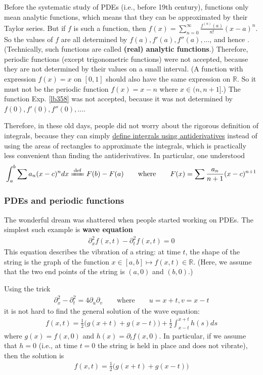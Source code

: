 \documentclass[12pt,b5paper,notitlepage]{article}
\theoremstyle{definition}
\theoremstyle{plain}
\newcommand{\Rbb}{\mathbb R}
\numberwithin{equation}{section}
\begin{document}
Before the systematic study of PDEs (i.e., before 19th century), functions only mean analytic functions, which means that they can be approximated by their Taylor series. But if $f$ is such a function, then $f(x)=\sum_{n=0}^\infty \frac{f^{(n)}(a)}{n!}(x-a)^n$. So the values of $f$ are all determined by $f(a),f'(a),f''(a),\dots$, and hence . (Technically, such functions are called \textbf{(real) analytic functions}.) Therefore, periodic functions (except trigonometric functions) were not accepted, because they are not determined by their values on a small interval. (A function with expression $f(x)=x$ on $[0,1]$ should also have the same expression on $\Rbb$. So it must not be the periodic function $f(x)=x-n$ where $x\in(n,n+1]$.) The function Exp. \ref{lb358} was not accepted, because it was not determined by $f(0),f'(0),f''(0),\dots$.

Therefore, in these old days, people did not worry about the rigorous definition of integrals, because they can simply \uline{define integrals using antiderivatives} instead of using the areas of rectangles to approximate the integrals, which is practically less convenient than finding the antiderivatives. In particular, one understood
\begin{align*}
\int_a^b \sum a_n (x-c)^ndx\xlongequal{\mathrm{def}}F(b)-F(a)\qquad\text{where}\qquad F(x)=\sum \frac{a_n}{n+1}(x-c)^{n+1}
\end{align*}

\subsubsection{PDEs and periodic functions}

The wonderful dream was shattered when people started working on PDEs. The simplest such example is \textbf{wave equation}
\begin{align}
\partial_x^2f(x,t)-\partial_t^2f(x,t)=0
\end{align} 
This equation describes the vibration of a string: at time $t$, the shape of the string is the graph of the function $x\in[a,b]\mapsto f(x,t)\in\Rbb$. (Here, we assume that the two end points of the string is $(a,0)$ and $(b,0)$.)

Using the trick
\begin{align*}
\partial_x^2-\partial_t^2=4\partial_u\partial_v\qquad\text{where}\qquad u=x+t,v=x-t
\end{align*}
it is not hard to find the general solution of the wave equation:
\begin{align}
f(x,t)=\frac 12\big(g(x+t)+g(x-t) \big)+\frac 12\int_{x-t}^{x+t}h(s)ds
\end{align}
where $g(x)=f(x,0)$ and $h(x)=\partial_t f(x,0)$. In particular, if we assume that $h=0$ (i.e., at time $t=0$ the string is held in place and does not vibrate), then the solution is
\begin{align}
f(x,t)=\frac 12\big(g(x+t)+g(x-t) \big)
\end{align}
\end{document}

